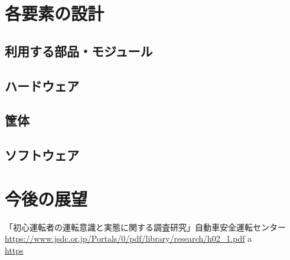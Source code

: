 \documentclass[titlepage,a4paper]{jsarticle}
\begin{document}
\section{各要素の設計}
\subsection{利用する部品・モジュール}
\subsection{ハードウェア}
\subsection{筐体}
\subsection{ソフトウェア}

\section{今後の展望}

\begin{thebibliography}{99}
   「初心運転者の運転意識と実態に関する調査研究」自動車安全運転センター\\%
  \url{https://www.jsdc.or.jp/Portals/0/pdf/library/research/h02_1.pdf}
  \bibitem{}a \\%
  \url{https}

\end{thebibliography}
\end{document}
